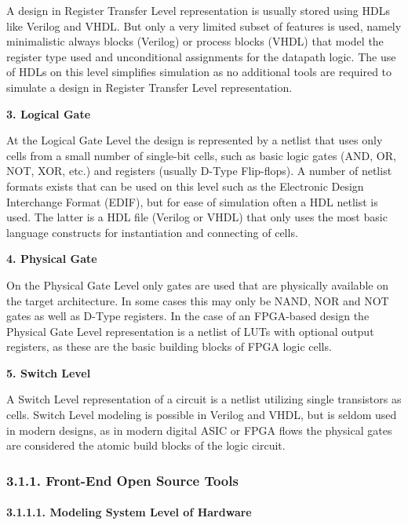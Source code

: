 \documentclass[]{article}
\let\oldparagraph\paragraph
\renewcommand{\paragraph}[1]{\oldparagraph{#1}\mbox{}}
\begin{document}
A design in Register Transfer Level representation is usually stored
using HDLs like Verilog and VHDL. But only a very limited subset of
features is used, namely minimalistic always blocks (Verilog) or process
blocks (VHDL) that model the register type used and unconditional
assignments for the datapath logic. The use of HDLs on this level
simplifies simulation as no additional tools are required to simulate a
design in Register Transfer Level representation.

\textbf{3. Logical Gate}

At the Logical Gate Level the design is represented by a netlist that
uses only cells from a small number of single-bit cells, such as basic
logic gates (AND, OR, NOT, XOR, etc.) and registers (usually D-Type
Flip-flops). A number of netlist formats exists that can be used on this
level such as the Electronic Design Interchange Format (EDIF), but for
ease of simulation often a HDL netlist is used. The latter is a HDL file
(Verilog or VHDL) that only uses the most basic language constructs for
instantiation and connecting of cells.

\textbf{4. Physical Gate}

On the Physical Gate Level only gates are used that are physically
available on the target architecture. In some cases this may only be
NAND, NOR and NOT gates as well as D-Type registers. In the case of an
FPGA-based design the Physical Gate Level representation is a netlist of
LUTs with optional output registers, as these are the basic building
blocks of FPGA logic cells.

\textbf{5. Switch Level}

A Switch Level representation of a circuit is a netlist utilizing single
transistors as cells. Switch Level modeling is possible in Verilog and
VHDL, but is seldom used in modern designs, as in modern digital ASIC or
FPGA flows the physical gates are considered the atomic build blocks of
the logic circuit.

\subsubsection{3.1.1. Front-End Open Source
Tools}\label{front-end-open-source-tools}

\paragraph{3.1.1.1. Modeling System Level of
Hardware}\label{modeling-system-level-of-hardware}
\end{document}
